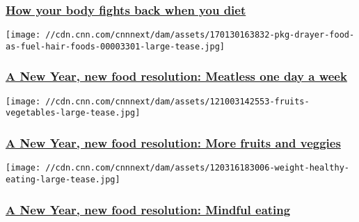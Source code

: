 \hypertarget{how-your-body-fights-back-when-you-diet}{%
\subsubsection{\texorpdfstring{\href{/2018/01/02/health/body-fights-dieting-food-partner/index.html}{How
your body fights back when you
diet}}{How your body fights back when you diet}}\label{how-your-body-fights-back-when-you-diet}}

\href{/2017/12/25/health/meatless-food-resolution-drayer/index.html}{}

\texttt{[image: //cdn.cnn.com/cnnnext/dam/assets/170130163832-pkg-drayer-food-as-fuel-hair-foods-00003301-large-tease.jpg]}

\hypertarget{a-new-year-new-food-resolution-meatless-one-day-a-week-}{%
\subsubsection{\texorpdfstring{\href{/2017/12/25/health/meatless-food-resolution-drayer/index.html}{A
New Year, new food resolution: Meatless one day a week
}}{A New Year, new food resolution: Meatless one day a week }}\label{a-new-year-new-food-resolution-meatless-one-day-a-week-}}

\href{/2017/12/25/health/fruits-vegetables-food-resolution-drayer/index.html}{}

\texttt{[image: //cdn.cnn.com/cnnnext/dam/assets/121003142553-fruits-vegetables-large-tease.jpg]}

\hypertarget{a-new-year-new-food-resolution-more-fruits-and-veggies}{%
\subsubsection{\texorpdfstring{\href{/2017/12/25/health/fruits-vegetables-food-resolution-drayer/index.html}{A
New Year, new food resolution: More fruits and
veggies}}{A New Year, new food resolution: More fruits and veggies}}\label{a-new-year-new-food-resolution-more-fruits-and-veggies}}

\href{/2017/12/25/health/mindful-eating-food-resolution-drayer/index.html}{}

\texttt{[image: //cdn.cnn.com/cnnnext/dam/assets/120316183006-weight-healthy-eating-large-tease.jpg]}

\hypertarget{a-new-year-new-food-resolution-mindful-eating}{%
\subsubsection{\texorpdfstring{\href{/2017/12/25/health/mindful-eating-food-resolution-drayer/index.html}{A
New Year, new food resolution: Mindful
eating}}{A New Year, new food resolution: Mindful eating}}\label{a-new-year-new-food-resolution-mindful-eating}}

